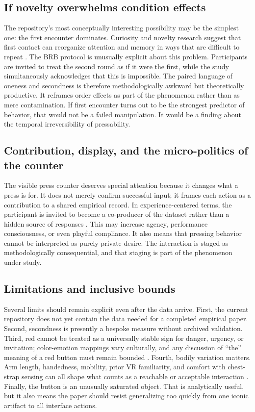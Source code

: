 \subsection{If novelty overwhelms condition effects}

The repository's most conceptually interesting possibility may be the simplest one: the first encounter dominates. Curiosity and novelty research suggest that first contact can reorganize attention and memory in ways that are difficult to repeat \citep{KiddHayden2015,RanganathRainer2003}. The BRB protocol is unusually explicit about this problem. Participants are invited to treat the second round as if it were the first, while the study simultaneously acknowledges that this is impossible. The paired language of oneness and secondness is therefore methodologically awkward but theoretically productive. It reframes order effects as part of the phenomenon rather than as mere contamination. If first encounter turns out to be the strongest predictor of behavior, that would not be a failed manipulation. It would be a finding about the temporal irreversibility of pressability.

\subsection{Contribution, display, and the micro-politics of the counter}

The visible press counter deserves special attention because it changes what a press is for. It does not merely confirm successful input; it frames each action as a contribution to a shared empirical record. In experience-centered terms, the participant is invited to become a co-producer of the dataset rather than a hidden source of responses \citep{McCarthyWright2004}. This may increase agency, performance consciousness, or even playful compliance. It also means that pressing behavior cannot be interpreted as purely private desire. The interaction is staged as methodologically consequential, and that staging is part of the phenomenon under study.

\subsection{Limitations and inclusive bounds}

Several limits should remain explicit even after the data arrive. First, the current repository does not yet contain the data needed for a completed empirical paper. Second, secondness is presently a bespoke measure without archived validation. Third, red cannot be treated as a universally stable sign for danger, urgency, or invitation; color-emotion mappings vary culturally, and any discussion of ``the'' meaning of a red button must remain bounded \citep{GaoEtAl2007,ElliotMaier2014}. Fourth, bodily variation matters. Arm length, handedness, mobility, prior VR familiarity, and comfort with chest-strap sensing can all shape what counts as a reachable or acceptable interaction \citep{Bonin2022,CummingsBailenson2016}. Finally, the button is an unusually saturated object. That is analytically useful, but it also means the paper should resist generalizing too quickly from one iconic artifact to all interface actions.

